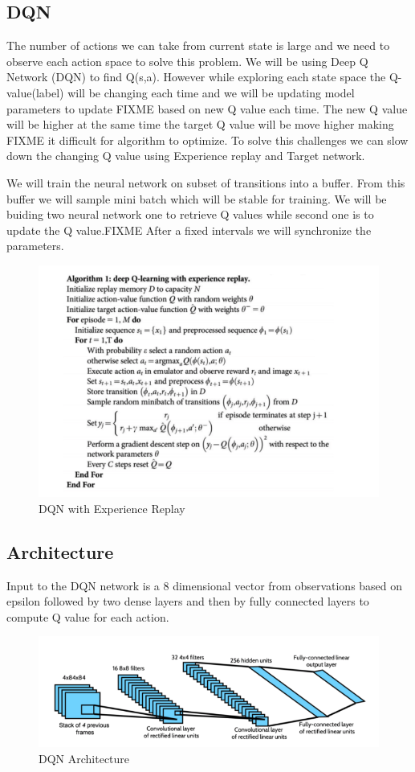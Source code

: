 \subsection{DQN}
The number of actions we can take from current state is large and we need to observe each action space to solve this problem. We will be using Deep Q Network (DQN) to find Q(s,a). However while exploring each state space the Q-value(label) will be changing each time and we will be updating model parameters to update FIXME based on new Q value each time. The new Q value will be higher at the same time the target Q value will be move higher making FIXME it difficult for algorithm to optimize. To solve this challenges we can slow down the changing Q value using Experience replay and Target network.

We will train the neural network on subset of transitions into a buffer. From this buffer we will sample mini batch which will be stable for training. We will be buiding two neural network one to retrieve Q values while second one is to update the Q value.FIXME After a fixed intervals we will synchronize the parameters. 

\begin{figure}%
\centering
\includegraphics[width=0.6\columnwidth]{figures/DQN-ExperinceReplay.png}%
\caption{DQN with Experience Replay}%
\label{fig:datastats}%
\end{figure}



\subsection{Architecture}

Input to the DQN network is a 8 dimensional vector from observations based on epsilon followed by two dense layers and then by fully connected layers to compute Q value for each action.

\begin{figure}%
\centering
\includegraphics[width=0.6\columnwidth]{figures/DQN-architecture.png}%
\caption{DQN Architecture}%
\label{fig:datastats}%
\end{figure}




